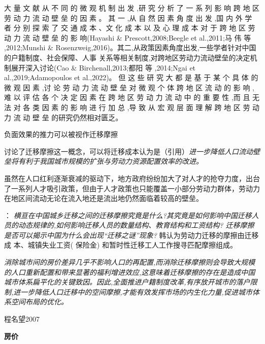 \documentclass[a4paper,12pt]{article}
\begin{document}
大 量 文 献 从 不 同 的 微 观 机 制 出 发 ,研 究 分 析 了 一 系 列 影 响 跨 地 区 劳 动 力 流 动 壁 垒 的 因 素 。 其 一 ,从 自 然 因 素 角 度 出 发 ,国 内 外 学 者 分 别 探 索 了 交 通 成 本 、文 化 成 本 以 及 心 理 成 本 对 于  跨 地 区 劳 动 力 流 动 壁 垒 的 影 响(Hayashi \& Prescott,2008;Beegle et al.,2011;马 伟 等 ,2012;Munshi \& Rosenzweig,2016)。其二,从政策因素角度出发,一些学者针对中国的户籍制度、社会保障、人事 关系等相关制度,对跨地区劳动力流动壁垒的决定机制展开深入讨论(Cao \& Birchenall,2013;都阳  等 ,2014;Ngai et al.,2019;Adamopoulos et al.,2022)。 但 这 些 研 究 大 都 是 基 于 某 个 具 体 的 微 观 因 素 ,讨 论 劳 动 力 流 动 壁 垒 对 微 观 个 体 跨 地 区 流 动 的 影 响 ,难 以 评 估 各 个 决 定 因 素 在 跨 地 区 劳 动 力 流 动 中 的 重 要 性 ,而 且 无 法 对 各 类 因 素 的 影 响 进 行 加 总 ,导 致 从 宏 观 层 面 理 解 跨 地 区 劳 动 力 流 动 壁 垒 的研究仍然相对匮乏。

负面效果的推力可以被视作迁移摩擦

\cite{WangLiLiWoGuoRenKouQianYiChengBenChengShiGuiMoYuShengChanLu2020}讨论了迁移摩擦这一概念，可以将迁移成本认为是（引用）\textit{进一步降低人口流动壁垒将有利于我国城市规模的扩张与劳动力资源配置效率的改进。}

虽然在人口红利逐渐衰减的驱动下，地方政府纷纷加大了对人才的抢夺力度，出台了一系列人才吸引政策，但由于人才政策也只能覆盖一小部分劳动力群体，劳动力在地区间流动无论在流入地还是流出地仍然面临着较高的壁垒。

\cite{HanQiHengNongCunLaoDongLiQianYiMoCaYingXiangNongMinGongShuLiangYuGongZiJieGouMa2018}：
\textit{横亘在中国城乡迁移之间的迁移摩擦究竟是什么?其究竟是如何影响中国迁移人员的动态规律的,如何影响迁移人员的数量结构、教育结构和工资结构? 迁移摩擦是否可以揭示中国为什么会出现“迁移之谜”现象?}
韩认为劳动力迁移的摩擦由迁移成 本、城镇失业工资( 保险金) 和暂时性迁移工人工作搜寻匹配摩擦组成。

\cite{LiuXiuYanFangJieQianYiMoCaYuZhongGuoChengShiDeGuiMoFenBuLiLunMoXingYuJieGouShiGuJi2017}
\textit{消除城市间的房价差异几乎不影响人口的再配置,而消除迁移摩擦则会导致大规模的人口重新配置和带来显著的福利增进效应,这意味着迁移摩擦的存在是造成中国城市体系扁平化的关键致因。因此,全面推进户籍制度改革,有序放开城市的落户限制,进一步降低人口迁移中的空间摩擦,才能有效发挥市场的内生化力量,促进城市体系空间布局的优化。}


程名望2007







\textbf{房价}
\end{document}
